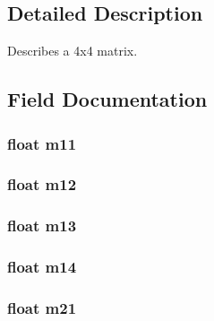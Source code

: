 \subsection{Detailed Description}
Describes a 4x4 matrix. 

\subsection{Field Documentation}
\hypertarget{struct_t_e3_d___matrix4x4f_a02c16113c6c4ce99349a1dc82bdc21cc}{
\subsubsection[{m11}]{\setlength{\rightskip}{0pt plus 5cm}float m11}}\label{struct_t_e3_d___matrix4x4f_a02c16113c6c4ce99349a1dc82bdc21cc}
\hypertarget{struct_t_e3_d___matrix4x4f_aec316cfb9b53d085372bf0cd0c769af1}{
\subsubsection[{m12}]{\setlength{\rightskip}{0pt plus 5cm}float m12}}\label{struct_t_e3_d___matrix4x4f_aec316cfb9b53d085372bf0cd0c769af1}
\hypertarget{struct_t_e3_d___matrix4x4f_ac7bf992102416f7ab7da5a4ef7341cb6}{
\subsubsection[{m13}]{\setlength{\rightskip}{0pt plus 5cm}float m13}}\label{struct_t_e3_d___matrix4x4f_ac7bf992102416f7ab7da5a4ef7341cb6}
\hypertarget{struct_t_e3_d___matrix4x4f_a2e0c3382c5e0ca04b5e12ca957888c0f}{
\subsubsection[{m14}]{\setlength{\rightskip}{0pt plus 5cm}float m14}}\label{struct_t_e3_d___matrix4x4f_a2e0c3382c5e0ca04b5e12ca957888c0f}
\hypertarget{struct_t_e3_d___matrix4x4f_a7f8222cebbd5007d7b56d367d0a6ab2a}{
\subsubsection[{m21}]{\setlength{\rightskip}{0pt plus 5cm}float m21}}\label{struct_t_e3_d___matrix4x4f_a7f8222cebbd5007d7b56d367d0a6ab2a}
